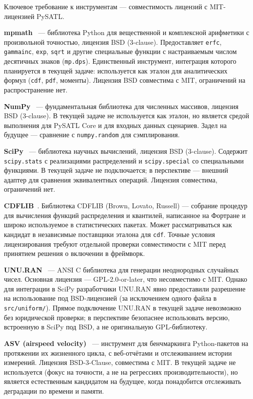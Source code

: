 \documentclass[12pt,a4paper]{article}
\begin{document}
Ключевое требование к инструментам --- совместимость лицензий
с MIT-лицензией PySATL.

\textbf{mpmath}~\cite{mpmath} --- библиотека Python для вещественной
и комплексной арифметики с произвольной точностью, лицензия BSD
(3-clause). Предоставляет \texttt{erfc}, \texttt{gammainc},
\texttt{exp}, \texttt{sqrt} и другие специальные функции
с настраиваемым числом десятичных знаков (\texttt{mp.dps}).
Единственный инструмент, интеграция которого планируется
в текущей задаче: используется как эталон для аналитических формул
(\texttt{cdf}, \texttt{pdf}, моменты). Лицензия BSD совместима
с MIT, ограничений на распространение нет.

\textbf{NumPy}~\cite{numpy} --- фундаментальная библиотека для
численных массивов, лицензия BSD (3-clause). В текущей задаче
не используется как эталон, но является средой выполнения
для PySATL Core и для входных данных сценариев. Задел на будущее ---
сравнение с \texttt{numpy.random} для сэмплирования.

\textbf{SciPy}~\cite{scipy_stats,scipy_special} --- библиотека
научных вычислений, лицензия BSD (3-clause). Содержит
\texttt{scipy.stats} с реализациями распределений и
\texttt{scipy.special} со специальными функциями. В текущей задаче
не подключается; в перспективе --- внешний адаптер для сравнения
эквивалентных операций. Лицензия совместима, ограничений нет.

\textbf{CDFLIB}~\cite{cdflib}. Библиотека CDFLIB (Brown, Lovato,
Russell) --- собрание процедур для вычисления функций распределения
и квантилей, написанное на Фортране и широко используемое
в статистических пакетах. Может рассматриваться как кандидат
в независимые поставщики эталона для \texttt{cdf}. Точные условия
лицензирования требуют отдельной проверки совместимости с MIT
перед принятием решения о включении в фреймворк.

\textbf{UNU.RAN}~\cite{unuran} --- ANSI C библиотека для генерации
неоднородных случайных чисел. Основная лицензия ---
GPL-2.0-or-later, что несовместимо с MIT. Однако для интеграции
в SciPy разработчики UNU.RAN явно предоставили разрешение
на использование под BSD-лицензией (за исключением одного файла
в \texttt{src/uniform/}). Прямое подключение UNU.RAN в текущей
задаче невозможно без юридической проверки; в перспективе
безопаснее использовать версию, встроенную в SciPy под BSD,
а не оригинальную GPL-библиотеку.

\textbf{ASV (airspeed velocity)}~\cite{asv} --- инструмент для
бенчмаркинга Python-пакетов на протяжении их жизненного цикла,
с веб-отчётами и отслеживанием истории измерений. Лицензия
BSD-3-Clause, совместима с MIT. В текущей задаче не используется
(фокус на точности, а не на регрессиях производительности),
но является естественным кандидатом на будущее, когда понадобится
отслеживать деградации по времени и памяти.
\end{document}
